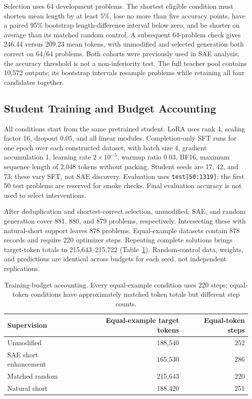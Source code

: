 Selection uses 64 development problems.
The shortest eligible condition must shorten mean length by at least 5\%, lose no more than five accuracy points, have a paired 95\% bootstrap length-difference interval below zero, and be shorter on average than its matched random control.
A subsequent 64-problem check gives 246.44 versus 209.23 mean tokens, with unmodified and selected generation both correct on 64/64 problems.
Both cohorts were previously used in SAE analysis; the accuracy threshold is not a non-inferiority test.
The full teacher pool contains 10,572 outputs; its bootstrap intervals resample problems while retaining all four candidates together.

\clearpage
\subsection{Student Training and Budget Accounting}
\label{app:training}

All conditions start from the same pretrained student.
LoRA uses rank 4, scaling factor 16, dropout 0.05, and all linear modules.
Completion-only SFT runs for one epoch over each constructed dataset, with batch size 4, gradient accumulation 1, learning rate $2\times10^{-5}$, warmup ratio 0.03, BF16, maximum sequence length of 2,048 tokens without packing.
Student seeds are 17, 42, and 73; these vary SFT, not SAE discovery.
Evaluation uses \texttt{test[50:1319]}; the first 50 test problems are reserved for smoke checks.
Final evaluation accuracy is not used to select interventions.

After deduplication and shortest-correct selection, unmodified, SAE, and random generation cover 881, 880, and 879 problems, respectively.
Intersecting these with natural-short support leaves 878 problems.
Equal-example datasets contain 878 records and require 220 optimizer steps.
Repeating complete solutions brings target-token totals to 215,643--215,722 (Table~\ref{tab:training_budgets}).
Random-control data, weights, and predictions are identical across budgets for each seed, not independent replications.

\begin{table}[htbp]
\centering
\small
\begin{tabular}{lrr}
\toprule
Supervision & Equal-example target tokens & Equal-token steps \\
\midrule
Unmodified & 188,540 & 252 \\
SAE short enhancement & 165,530 & 286 \\
Matched random & 215,643 & 220 \\
Natural short & 188,420 & 251 \\
\bottomrule
\end{tabular}
\caption{Training-budget accounting. Every equal-example condition uses 220 steps; equal-token conditions have approximately matched token totals but different step counts.}
\label{tab:training_budgets}
\end{table}

